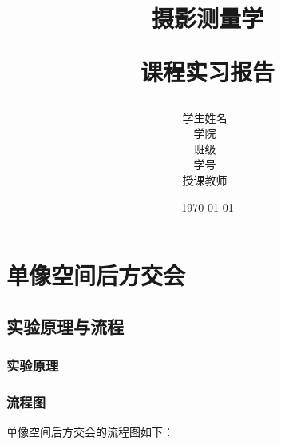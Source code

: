 \documentclass[12pt,hyperref,a4paper,UTF8]{ctexart}
\title{ 
        \heiti \xiaochuhao \textbf{{摄影测量学}} \par
        \heiti \xiaochuhao \textbf{{课程实习报告}} \par
    }
\author{
        \vspace{0.5cm}
        \kaishu\Large 学生姓名\ \dlmu[9cm]{X} \qquad \\ %
        \vspace{0.5cm}
        \kaishu\Large 学\hspace{2em}院\ \dlmu[9cm]{李四光学院} \qquad \\ %
        \vspace{0.5cm}
        \kaishu\Large 班\hspace{2em}级\ \dlmu[9cm]{201226} \\ %
        \vspace{0.5cm}
        \kaishu\Large 学\hspace{2em}号\ \dlmu[9cm]{2022100X} \\ %
        \vspace{0.5cm}
        \kaishu\Large 授课教师\ \dlmu[9cm]{XX} \qquad  \\ 
        \vspace{1cm}
    }
\date{\today} %
\begin{document}
\cover
\thispagestyle{empty} %




\newpage
\tableofcontents
 \thispagestyle{empty} %

\newpage
\setcounter{page}{1} %

\section{单像空间后方交会}

\subsection{实验原理与流程}

\subsubsection{实验原理}

    
\subsubsection{流程图}
单像空间后方交会的流程图如下：
\end{document}
